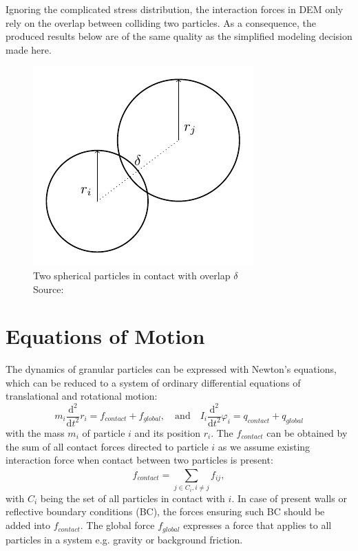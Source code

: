 \documentclass[11pt,
               a4paper,
               bibtotoc,
               idxtotoc,
               headsepline,
               footsepline,
               footexclude,
               BCOR12mm,
               DIV13,
               openany,   %
               ]
               {scrbook}
\begin{document}
Ignoring the complicated stress distribution, the interaction forces in DEM only rely on the overlap between colliding two particles. As a consequence, the produced results below are of the same quality as the simplified modeling decision made here. 

    \begin{figure}[H] %
	\centering
	\includegraphics[width=.3\columnwidth]{figures/discrete_spherical_particle_model.pdf}
	\caption[Example Figure]{Two spherical particles in contact with overlap $\delta$ \\
		\tiny{Source: \cite{gratl17task}}}
	\label{fig:discrete_spherical_particle_model} %
\end{figure}

\chapter{Equations of Motion}
The dynamics of granular particles can be expressed with Newton's equations, which can be reduced to a system of ordinary differential equations of translational and rotational  motion:
\begin{equation}
	m_i \frac{\mathrm{d}^2}{\mathrm{d}t^2} r_i = f_{contact} + f_{global}, \quad \text{and} \quad
	I_i \frac{\mathrm{d}^2}{\mathrm{d}t^2} \varphi_i = q_{contact} + q_{global}
\end{equation}
with the mass $m_i$  of particle $i$ and its position $r_i$. The $f_{contact}$ can be obtained by the sum of all contact forces directed to particle $i$ as we assume existing interaction force when contact between two particles is present:
\begin{equation}
f_{contact} = \sum_{j \in C_{i}, i \neq j}^{} f_{ij},
\end{equation}
with $C_i$ being the set of all particles in contact with $i$. In case of present walls or reflective boundary conditions (BC), the forces ensuring such BC should be added into $f_{contact}$.
The global force $f_{global}$ expresses a force that applies to all particles in a system e.g. gravity or background friction.
\end{document}

